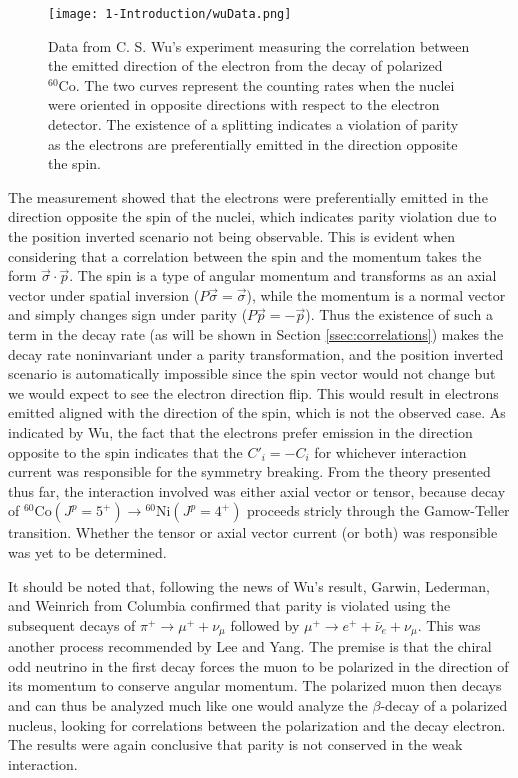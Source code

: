 \begin{figure}[h]
  \centering
  \texttt{[image: 1-Introduction/wuData.png]}  
  \caption{Data from C. S. Wu's experiment measuring the correlation between the emitted
    direction of the electron from the decay of polarized $^{60}\mathrm{Co}$. The two
    curves represent the counting rates when the nuclei were oriented in opposite
    directions with respect to the electron detector. The existence of a splitting
    indicates a violation of parity as the electrons are preferentially emitted in the
    direction opposite the spin.}
  \label{fig:wuData}
\end{figure}

The measurement showed that the electrons were preferentially
emitted in the direction opposite the spin of the nuclei, which indicates parity violation due to
the position inverted scenario not being observable. This is evident when considering that
a correlation between the spin and the momentum takes the form $\vec{\sigma} \cdot \vec{p}$.
The spin is a type of angular momentum and transforms as an axial vector under spatial inversion
($P\vec{\sigma}=\vec{\sigma}$), while the momentum is a normal vector and
simply changes sign under parity ($P\vec{p}=-\vec{p}$). Thus the existence of
such a term in the decay rate (as will be shown in Section \ref{ssec:correlations}) makes the
decay rate noninvariant under a parity transformation, and the position inverted scenario
is automatically impossible since the spin vector would not change but we would expect to see
the electron direction flip. This would result in electrons emitted aligned with the direction
of the spin, which is not the observed case. As indicated by Wu,
the fact that the electrons prefer emission in the direction opposite
to the spin indicates that the $C'_i=-C_i$ for whichever
interaction current was responsible for the symmetry breaking. From the theory presented thus far,
the interaction involved was either axial vector or tensor, because decay of
$^{60}\mathrm{Co} (J^p=5^+) \rightarrow {^{60}\mathrm{Ni}}(J^p=4^+)$ proceeds stricly through
the Gamow-Teller transition. Whether the tensor or axial vector current (or both) was responsible
was yet to be determined.

It should be noted that, following the news of Wu's result, Garwin, Lederman, and
Weinrich \cite{garwin1957} from Columbia confirmed
that parity is violated using the subsequent decays of $\pi^+ \rightarrow \mu^++\nu_\mu$
followed by $\mu^+ \rightarrow e^+ + \bar{\nu}_e + \nu_\mu$. This was another process
recommended by Lee and Yang. The premise is that the chiral odd neutrino in the first decay
forces the muon to be polarized in the direction of its momentum to conserve angular
momentum. The polarized muon then decays and can thus be analyzed much like one would analyze the
$\beta$-decay of a polarized nucleus, looking for correlations between the polarization and
the decay electron. The results were again conclusive that parity is not conserved in the weak
interaction.

